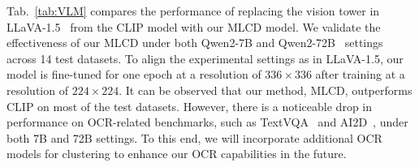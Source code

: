 
Tab.~\ref{tab:VLM} compares the performance of replacing the vision tower in LLaVA-1.5~\cite{liu2024llava_V1_5} from the CLIP model with our MLCD model. We validate the effectiveness of our MLCD under both Qwen2-7B and Qwen2-72B~\cite{qwen1,qwen2} settings across 14 test datasets. To align the experimental settings as in LLaVA-1.5, our model is fine-tuned for one epoch at a resolution of $336\times336$
after training at a resolution of $224\times224$.
It can be observed that our method, MLCD, outperforms CLIP on most of the test datasets. However, there is a noticeable drop in performance on OCR-related benchmarks, such as TextVQA~\cite{vlm_text_vqa} and AI2D~\cite{vlm_ai2d}, under both 7B and 72B settings. 
To this end, we will incorporate additional OCR models for clustering to enhance our OCR capabilities in the future.

